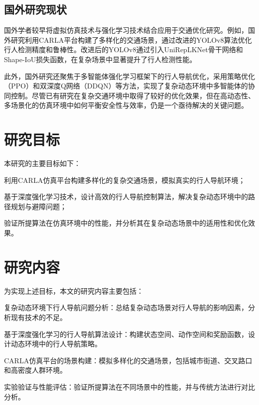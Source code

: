 \subsection{国外研究现状}

国外学者较早将虚拟仿真技术与强化学习技术结合应用于交通优化研究。例如，国外研究利用CARLA平台构建了多样化的交通场景，通过改进的YOLOv8算法优化行人检测精度和鲁棒性。改进后的YOLOv8通过引入UniRepLKNet骨干网络和Shape-IoU损失函数，在复杂场景中显著提升了行人检测性能。

此外，国外研究还聚焦于多智能体强化学习框架下的行人导航优化，采用策略优化（PPO）和双深度Q网络（DDQN）等方法，实现了复杂动态环境中多智能体的协同控制。尽管已有研究在复杂交通环境中取得了较好的优化效果，但在高动态性、多场景化的仿真环境中如何平衡安全性与效率，仍是一个亟待解决的关键问题。

\section{研究目标}

本研究的主要目标如下：

利用CARLA仿真平台构建多样化的复杂交通场景，模拟真实的行人导航环境；

基于深度强化学习技术，设计高效的行人导航控制算法，解决复杂动态环境中的路径规划与避障问题；

验证所提算法在仿真环境中的性能，并分析其在复杂动态场景中的适用性和优化效果。

\section{研究内容}

为实现上述目标，本文的研究内容主要包括：

复杂动态环境下行人导航问题分析：总结复杂动态场景对行人导航的影响因素，分析现有技术的不足。

基于深度强化学习的行人导航算法设计：构建状态空间、动作空间和奖励函数，设计动态环境中的行人导航策略。

CARLA仿真平台的场景构建：模拟多样化的交通场景，包括城市街道、交叉路口和高密度人群环境。

实验验证与性能评估：验证所提算法在不同场景中的性能，并与传统方法进行对比分析。

